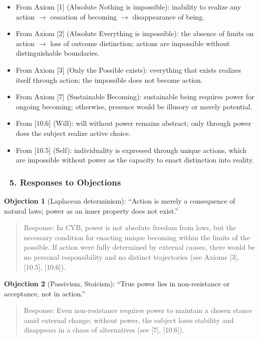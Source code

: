\documentclass[12pt]{article}
\begin{document}
\begin{itemize}
\item From Axiom [1] (Absolute Nothing is impossible): inability to realize any action $\rightarrow$ cessation of becoming $\rightarrow$ disappearance of being.
\item From Axiom [2] (Absolute Everything is impossible): the absence of limits on action $\rightarrow$ loss of outcome distinction; actions are impossible without distinguishable boundaries.
\item From Axiom [3] (Only the Possible exists): everything that exists realizes itself through action; the impossible does not become action.
\item From Axiom [7] (Sustainable Becoming): sustainable being requires power for ongoing becoming; otherwise, presence would be illusory or merely potential.
\item From [10.6] (Will): will without power remains abstract; only through power does the subject realize active choice.
\item From [10.5] (Self): individuality is expressed through unique actions, which are impossible without power as the capacity to enact distinction into reality.
\end{itemize}

\subsubsection*{🔹 5. Responses to Objections}

\textbf{Objection 1} (Laplacean determinism): ``Action is merely a consequence of natural laws; power as an inner property does not exist.''

\begin{quote}
Response: In CVB, power is not absolute freedom from laws, but the necessary condition for enacting unique becoming within the limits of the possible. If action were fully determined by external causes, there would be no personal responsibility and no distinct trajectories (see Axioms [3], [10.5], [10.6]).
\end{quote}

\textbf{Objection 2} (Passivism, Stoicism): ``True power lies in non-resistance or acceptance, not in action.''

\begin{quote}
Response: Even non-resistance requires power to maintain a chosen stance amid external change; without power, the subject loses stability and disappears in a chaos of alternatives (see [7], [10.6]).
\end{quote}
\end{document}
